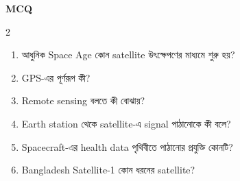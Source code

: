 \begin{practicebox}
\textbf{MCQ}
\begin{multicols}{2}\begin{enumerate}
\item \begin{minipage}[t]{\linewidth}আধুনিক Space Age কোন satellite উৎক্ষেপণের মাধ্যমে শুরু হয়?\par {}\par\end{minipage}

\item \begin{minipage}[t]{\linewidth}GPS-এর পূর্ণরূপ কী?\par {}\par\end{minipage}

\item \begin{minipage}[t]{\linewidth}Remote sensing বলতে কী বোঝায়?\par {}\par\end{minipage}

\item \begin{minipage}[t]{\linewidth}Earth station থেকে satellite-এ signal পাঠানোকে কী বলে?\par {}\par\end{minipage}

\item \begin{minipage}[t]{\linewidth}Spacecraft-এর health data পৃথিবীতে পাঠানোর প্রযুক্তি কোনটি?\par {}\par\end{minipage}

\item \begin{minipage}[t]{\linewidth}Bangladesh Satellite-1 কোন ধরনের satellite?\par {}\par\end{minipage}


\end{enumerate}
\end{multicols}
\end{practicebox}

